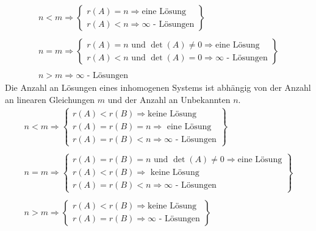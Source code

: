 \begin{equation}
\boxed{
\begin{array}{l}
n<m\Rightarrow\left\{
\begin{matrix}r(A)=n\Rightarrow\text{eine Lösung}\\r(A)<n\Rightarrow\infty\text{ - Lösungen}\end{matrix}\right\}\\\\
n=m\Rightarrow\left\{
\begin{matrix}r(A)=n \text{ und } \det(A)\neq 0\Rightarrow\text{eine Lösung}\\r(A)<n \text{ und } \det(A)=0\Rightarrow\infty\text{ - Lösungen}\end{matrix}\right\}\\\\
n>m\Rightarrow \infty\text{ - Lösungen}
\end{array}
}
\end{equation}
Die Anzahl an Lösungen eines inhomogenen Systems ist abhängig von der Anzahl an linearen Gleichungen $m$ und der Anzahl an Unbekannten $n$.
\begin{equation}
\boxed{
\begin{array}{l}
n<m\Rightarrow\left\{
\begin{matrix}r(A)<r(B)\Rightarrow\text{keine Lösung}\\r(A)=r(B)=n\Rightarrow\text{ eine Lösung}\\r(A)=r(B)<n\Rightarrow\infty\text{ - Lösungen}\end{matrix}\right\}\\\\
n=m\Rightarrow\left\{
\begin{matrix}r(A)=r(B)=n \text{ und } \det(A)\neq 0\Rightarrow\text{eine Lösung}\\r(A)<r(B) \Rightarrow\text{ keine Lösung}\\r(A)=r(B)<n \Rightarrow\infty\text{ - Lösungen}\end{matrix}\right\}\\\\
n>m\Rightarrow\left\{
\begin{matrix}r(A)<r(B) \Rightarrow\text{keine Lösung}\\r(A)=r(B) \Rightarrow\infty\text{ - Lösungen}\end{matrix}\right\}\\\\
\end{array}
}
\end{equation}
